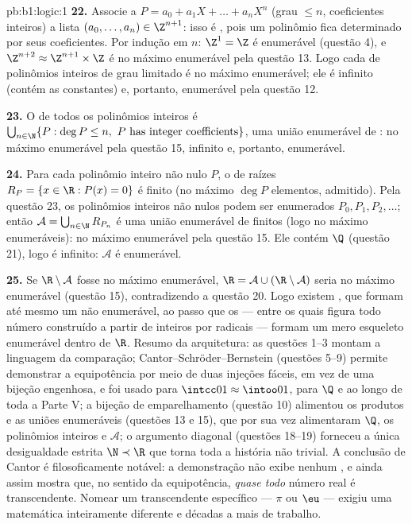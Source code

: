 \begin{solution}{pb:b1:logic:1}
\textbf{22.} Associe a $P = a_0 + a_1X + \dots + a_nX^n$ (grau $\leq n$,
coeficientes inteiros) a lista $(a_0, \dots, a_n) \in \Z^{n+1}$: isso é
, pois um polinômio fica determinado por seus coeficientes. Por
indução em $n$: $\Z^1 = \Z$ é enumerável (questão 4), e
$\Z^{n+2} \approx \Z^{n+1} \times \Z$ é no máximo enumerável pela
questão 13. Logo cada  de polinômios inteiros de grau limitado é
no máximo enumerável; ele é infinito (contém as constantes) e, portanto,
enumerável pela questão 12.

\textbf{23.} O  de todos os polinômios inteiros é $\bigcup_{n \in
\N} \{P : \deg P \leq n,\ P \text{ has integer coefficients}\}$, uma
união enumerável de : no máximo enumerável pela
questão 15, infinito e, portanto, enumerável.

\textbf{24.} Para cada polinômio inteiro não nulo $P$, o  de raízes
$R_P = \{x \in \R : P(x) = 0\}$ é finito (no máximo $\deg P$
elementos, admitido). Pela questão 23, os polinômios inteiros não nulos
podem ser enumerados $P_0, P_1, P_2, \dots$; então $\mathcal{A} =
\bigcup_{n \in \N} R_{P_n}$ é uma união enumerável de  finitos (logo
no máximo enumeráveis): no máximo enumerável pela questão 15. Ele
contém $\Q$ (questão 21), logo é infinito: $\mathcal{A}$ é
enumerável.

\textbf{25.} Se $\R \setminus \mathcal{A}$ fosse no máximo enumerável,
$\R = \mathcal{A} \cup (\R \setminus \mathcal{A})$ seria no máximo
enumerável (questão 15), contradizendo a questão 20. Logo existem
, que formam até mesmo um  não enumerável,
ao passo que os  --- entre os quais figura todo número
construído a partir de inteiros por radicais --- formam um mero esqueleto
enumerável dentro de $\R$. Resumo da arquitetura: as questões 1--3 montam
a linguagem da comparação; Cantor--Schröder--Bernstein (questões
5--9) permite demonstrar a equipotência por meio de duas injeções fáceis,
em vez de uma bijeção engenhosa, e foi usado para $\intcc01 \approx \intoo01$,
para $\Q$ e ao longo de toda a Parte V; a bijeção de emparelhamento
(questão 10) alimentou os produtos e as uniões enumeráveis (questões 13
e 15), que por sua vez alimentaram $\Q$, os polinômios inteiros e
$\mathcal{A}$; o argumento diagonal (questões 18--19) forneceu
a única desigualdade estrita $\N \prec \R$ que torna toda a história
não trivial. A conclusão de Cantor é filosoficamente notável: a
demonstração não exibe nenhum , e ainda assim mostra
que, no sentido da equipotência, \emph{quase todo} número real é
transcendente. Nomear um transcendente específico --- $\pi$ ou
$\eu$ --- exigiu uma matemática inteiramente diferente e décadas a mais
de trabalho.
\end{solution}
